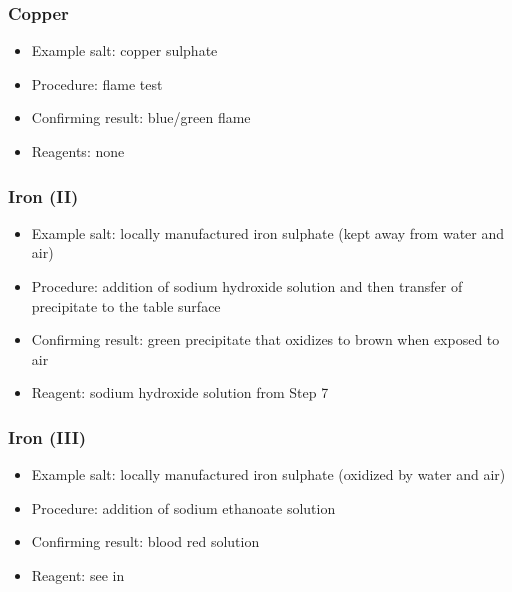 \subsubsection{Copper}
\begin{itemize}
\item{Example salt: copper sulphate}
\item{Procedure: flame test}
\item{Confirming result: blue/green flame}
\item{Reagents: none}
\end{itemize}

\subsubsection{Iron (II)}
\begin{itemize}
\item{Example salt: locally manufactured iron sulphate 
(kept away from water and air)}
\item{Procedure: addition of sodium hydroxide solution 
and then transfer of precipitate to the table surface}
\item{Confirming result: green precipitate 
that oxidizes to brown when exposed to air}
\item{Reagent: sodium hydroxide solution from Step 7}
\end{itemize}

\subsubsection{Iron (III)}
\begin{itemize}
\item{Example salt: locally manufactured iron sulphate 
(oxidized by water and air)}
\item{Procedure: addition of sodium ethanoate solution}
\item{Confirming result: blood red solution}
\item{Reagent: see  in }
\end{itemize}

